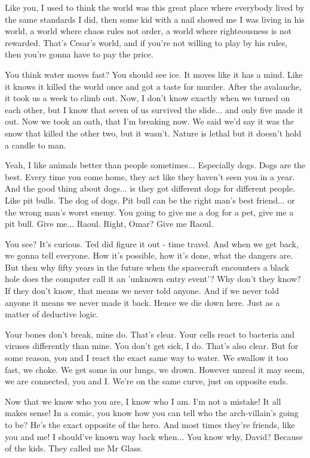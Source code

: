 \documentclass{book}
\begin{document}
Like you, I used to think the world was this great place where everybody lived by the same standards I did, then some kid with a nail showed me I was living in his world, a world where chaos rules not order, a world where righteousness is not rewarded. That's Cesar's world, and if you're not willing to play by his rules, then you're gonna have to pay the price.

You think water moves fast? You should see ice. It moves like it has a mind. Like it knows it killed the world once and got a taste for murder. After the avalanche, it took us a week to climb out. Now, I don't know exactly when we turned on each other, but I know that seven of us survived the slide... and only five made it out. Now we took an oath, that I'm breaking now. We said we'd say it was the snow that killed the other two, but it wasn't. Nature is lethal but it doesn't hold a candle to man.

Yeah, I like animals better than people sometimes... Especially dogs. Dogs are the best. Every time you come home, they act like they haven't seen you in a year. And the good thing about dogs... is they got different dogs for different people. Like pit bulls. The dog of dogs. Pit bull can be the right man's best friend... or the wrong man's worst enemy. You going to give me a dog for a pet, give me a pit bull. Give me... Raoul. Right, Omar? Give me Raoul.

You see? It's curious. Ted did figure it out - time travel. And when we get back, we gonna tell everyone. How it's possible, how it's done, what the dangers are. But then why fifty years in the future when the spacecraft encounters a black hole does the computer call it an 'unknown entry event'? Why don't they know? If they don't know, that means we never told anyone. And if we never told anyone it means we never made it back. Hence we die down here. Just as a matter of deductive logic.

Your bones don't break, mine do. That's clear. Your cells react to bacteria and viruses differently than mine. You don't get sick, I do. That's also clear. But for some reason, you and I react the exact same way to water. We swallow it too fast, we choke. We get some in our lungs, we drown. However unreal it may seem, we are connected, you and I. We're on the same curve, just on opposite ends.

Now that we know who you are, I know who I am. I'm not a mistake! It all makes sense! In a comic, you know how you can tell who the arch-villain's going to be? He's the exact opposite of the hero. And most times they're friends, like you and me! I should've known way back when... You know why, David? Because of the kids. They called me Mr Glass.
\end{document}
